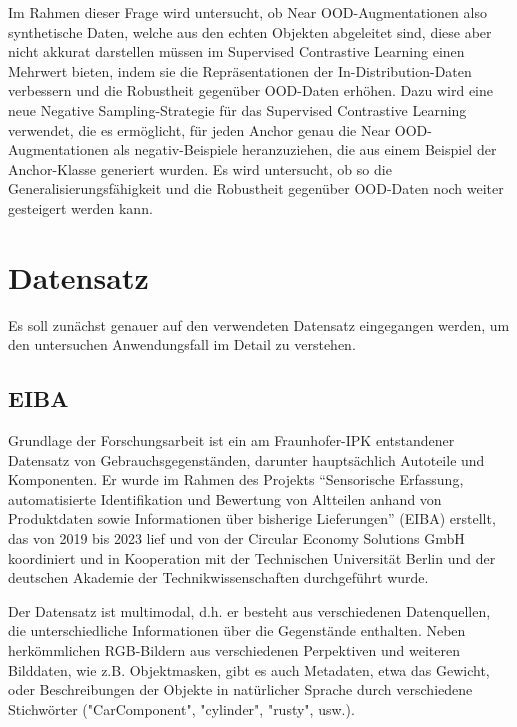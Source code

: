 Im Rahmen dieser Frage wird untersucht, ob Near OOD-Augmentationen \textemdash also synthetische Daten, welche aus den echten Objekten abgeleitet sind, diese aber nicht akkurat darstellen müssen \textemdash im Supervised Contrastive Learning einen Mehrwert bieten, indem sie die Repräsentationen der In-Distribution-Daten verbessern und die Robustheit gegenüber OOD-Daten erhöhen. Dazu wird eine neue Negative Sampling-Strategie für das Supervised Contrastive Learning verwendet, die es ermöglicht, für jeden Anchor genau die Near OOD-Augmentationen als negativ-Beispiele heranzuziehen, die aus einem Beispiel der Anchor-Klasse generiert wurden. Es wird untersucht, ob so die Generalisierungsfähigkeit und die Robustheit gegenüber OOD-Daten noch weiter gesteigert werden kann.


\section{Datensatz} \label{sec:dataset}

Es soll zunächst genauer auf den verwendeten Datensatz eingegangen werden, um den untersuchen Anwendungsfall im Detail zu verstehen.

\subsection{EIBA} \label{sec:eiba}

Grundlage der Forschungsarbeit ist ein am Fraunhofer-IPK entstandener Datensatz von Gebrauchsgegenständen, darunter hauptsächlich Autoteile und Komponenten. Er wurde im Rahmen des Projekts “Sensorische Erfassung, automatisierte Identifikation und Bewertung von Altteilen anhand von Produktdaten sowie Informationen über bisherige Lieferungen” (EIBA) erstellt, das von 2019 bis 2023 lief und von der Circular Economy Solutions GmbH koordiniert und in Kooperation mit der Technischen Universität Berlin und der deutschen Akademie der Technikwissenschaften durchgeführt wurde. \parencite{}

Der Datensatz ist multimodal, d.h. er besteht aus verschiedenen Datenquellen, die unterschiedliche Informationen über die Gegenstände enthalten. Neben herkömmlichen RGB-Bildern aus verschiedenen Perpektiven und weiteren Bilddaten, wie z.B. Objektmasken, gibt es auch Metadaten, etwa das Gewicht, oder Beschreibungen der Objekte in natürlicher Sprache durch verschiedene Stichwörter ("CarComponent", "cylinder", "rusty", usw.).

